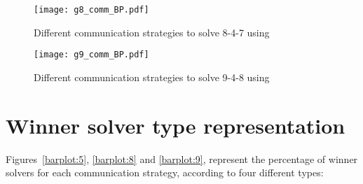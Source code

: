 \begin{figure}[!h]
\centering
\texttt{[image: g8\_comm\_BP.pdf]}
\caption{Different communication strategies to solve \SGP{} 8-4-7 using \posl}\label{boxplot:8comm}
\end{figure}

\begin{figure}[!h]
\centering
\texttt{[image: g9\_comm\_BP.pdf]}
\caption{Different communication strategies to solve \SGP{} 9-4-8 using \posl}\label{boxplot:9comm}
\end{figure}

\newpage




\section{Winner solver type representation}

Figures~\ref{barplot:5}, \ref{barplot:8} and \ref{barplot:9}, represent the percentage of winner solvers for each communication strategy, according to four different types:


